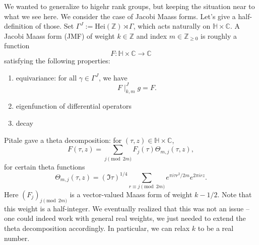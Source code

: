 \documentclass[reqno]{amsart} 
\numberwithin{theorem}{section}
\numberwithin{equation}{section}
\begin{document}
We wanted to generalize to higehr rank groups, but keeping the situation near to what we see here.  We consider the case of Jacobi Maass forms.  Let's give a half-definition of those.  Set $\Gamma^J := \mathrm{Hei}(\mathbb{Z}) \rtimes \Gamma$, which acts naturally on $\mathbb{H} \times \mathbb{C}$.  A Jacobi Maass form (JMF) of weight $k \in \mathbb{Z}$ and index $m \in \mathbb{Z}_{\geq 0}$ is roughly a function
\begin{equation*}
  F : \mathbb{H} \times \mathbb{C} \rightarrow \mathbb{C}
\end{equation*}
satisfying the following properties:
\begin{enumerate}
\item equivariance: for all $\gamma \in \Gamma^J$, we have
  \begin{equation*}
    F \mid_{k, m}^J g = F.
  \end{equation*}
\item eigenfunction of differential operators
\item decay
\end{enumerate}

Pitale gave a theta decomposition: for $(\tau, z) \in \mathbb{H} \times \mathbb{C}$,
\begin{equation*}
  F(\tau, z) = \sum_{j \pmod{2 m}} F_j(\tau) \Theta_{m, j}(\tau, z),
\end{equation*}
for certain theta functions
\begin{equation*}
  \Theta_{m, j}(\tau, z) = \left( \Im \tau \right)^{1/4} \sum_{r \equiv j \pmod{2 m}}
  e^{\pi i \tau r^2 / 2 m} e^{2 \pi i r z}.
\end{equation*}
Here $(F_j)_{j \pmod{2 m}}$ is a vector-valued Maass form of weight $k - 1/2$.  Note that this weight is a half-integer.  We eventually realized that this was not an issue -- one could indeed work with general real weights, we just needed to extend the theta decomposition accordingly.  In particular, we can relax $k$ to be a real number.
\end{document}
